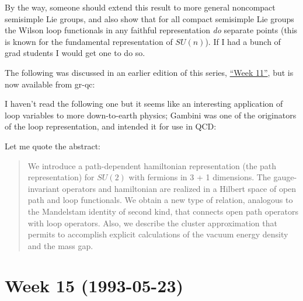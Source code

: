 \documentclass{article}
\def\tightlist{}
\renewcommand{\texttt}[1]{%
  \begingroup
  \ttfamily
  \begingroup\lccode`~=`/\lowercase{\endgroup\def~}{/\discretionary{}{}{}}%
  \begingroup\lccode`~=`[\lowercase{\endgroup\def~}{[\discretionary{}{}{}}%
  \begingroup\lccode`~=`.\lowercase{\endgroup\def~}{.\discretionary{}{}{}}%
  \catcode`/=\active\catcode`[=\active\catcode`.=\active
  \scantokens{#1\noexpand}%
  \endgroup
}
\begin{document}
By the way, someone should extend this result to more general noncompact
semisimple Lie groups, and also show that for all compact semisimple Lie
groups the Wilson loop functionals in any faithful representation
\emph{do} separate points (this is known for the fundamental
representation of \(SU(n)\)). If I had a bunch of grad students I would
get one to do so.

The following was discussed in an earlier edition of this series,
\protect\hyperlink{week11}{``Week 11''}, but is now available from
gr-qc:


I haven't read the following one but it seems like an interesting
application of loop variables to more down-to-earth physics; Gambini was
one of the originators of the loop representation, and intended it for
use in QCD:


Let me quote the abstract:

\begin{quote}
We introduce a path-dependent hamiltonian representation (the path
representation) for \(SU(2)\) with fermions in 3 + 1 dimensions. The
gauge-invariant operators and hamiltonian are realized in a Hilbert
space of open path and loop functionals. We obtain a new type of
relation, analogous to the Mandelstam identity of second kind, that
connects open path operators with loop operators. Also, we describe the
cluster approximation that permits to accomplish explicit calculations
of the vacuum energy density and the mass gap.
\end{quote}
\hypertarget{week15}{%
\section{Week 15 (1993-05-23)}\label{week15}}
\end{document}
